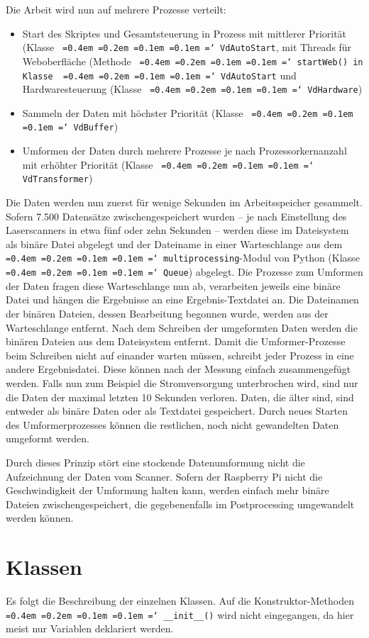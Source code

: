 \documentclass[a4paper,12pt,bibliography=totoc, listof=totoc,titlepage,pointlessnumbers]{scrreprt}
\newcommand*\justify{%
  \fontdimen2\font=0.4em%
  \fontdimen3\font=0.2em%
  \fontdimen4\font=0.1em%
  \fontdimen7\font=0.1em%
  \hyphenchar\font=`\-%
}
\newcommand{\code}[1]{\texttt{\justify{#1}}}
\begin{document}
Die Arbeit wird nun auf mehrere Prozesse verteilt:
\begin{itemize}
 \item Start des Skriptes und Gesamtsteuerung in Prozess mit mittlerer Priorität (Klasse \code{VdAutoStart}, mit Threads für Weboberfläche (Methode \code{startWeb() in Klasse \code{VdAutoStart}} und Hardwaresteuerung (Klasse \code{VdHardware})
 \item Sammeln der Daten mit höchster Priorität (Klasse \code{VdBuffer})
 \item Umformen der Daten durch mehrere Prozesse je nach Prozessorkernanzahl mit erhöhter Priorität (Klasse \code{VdTransformer})
\end{itemize}

Die Daten werden nun zuerst für wenige Sekunden im Arbeitsspeicher gesammelt. Sofern 7.500 Datensätze zwischengespeichert wurden -- je nach Einstellung des Laser\-scan\-ners in etwa fünf oder zehn Sekunden -- werden diese im Dateisystem als binäre Datei abgelegt und der Dateiname in einer Warteschlange aus dem \code{multiprocessing}-Modul von Python (Klasse \code{Queue}) abgelegt. Die Prozesse zum Umformen der Daten fragen diese Warteschlange nun ab, verarbeiten jeweils eine binäre Datei und hängen die Ergebnisse an eine Ergebnis-Textdatei an. Die Dateinamen der binären Dateien, dessen Bearbeitung begonnen wurde, werden aus der Warteschlange entfernt. Nach dem Schreiben der umgeformten Daten werden die binären Dateien aus dem Dateisystem entfernt. Damit die Umformer-Prozesse beim Schreiben nicht auf einander warten müssen, schreibt jeder Prozess in eine andere Ergebnisdatei. Diese können nach der Messung einfach zusammengefügt werden. Falls nun zum Beispiel die Stromversorgung unterbrochen wird, sind nur die Daten der maximal letzten 10 Sekunden verloren. Daten, die älter sind, sind entweder als binäre Daten oder als Textdatei gespeichert. Durch neues Starten des Umformerprozesses können die restlichen, noch nicht gewandelten Daten umgeformt werden.

Durch dieses Prinzip stört eine stockende Datenumformung nicht die Aufzeichnung der Daten vom Scanner. Sofern der Raspberry Pi nicht die Geschwindigkeit der Umformung halten kann, werden einfach mehr binäre Dateien zwischengespeichert, die gegebenenfalls im Postprocessing umgewandelt werden können.

\section{Klassen}
\label{s:klassen}
Es folgt die Beschreibung der einzelnen Klassen. Auf die Konstruktor-Methoden \code{\_\_init\_\_()} wird nicht eingegangen, da hier meist nur Variablen deklariert werden.
\end{document}

